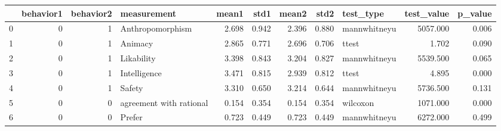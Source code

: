 \begin{tabular}{lrrlrrrrlrr}
\toprule
{} &  behavior1 &  behavior2 &              measurement &  mean1 &   std1 &  mean2 &   std2 &     test\_type &  test\_value &  p\_value \\
\midrule
0 &          0 &          1 &         Anthropomorphism &  2.698 &  0.942 &  2.396 &  0.880 &  mannwhitneyu &    5057.000 &    0.006 \\
1 &          0 &          1 &                  Animacy &  2.865 &  0.771 &  2.696 &  0.706 &         ttest &       1.702 &    0.090 \\
2 &          0 &          1 &               Likability &  3.398 &  0.843 &  3.204 &  0.827 &  mannwhitneyu &    5539.500 &    0.065 \\
3 &          0 &          1 &             Intelligence &  3.471 &  0.815 &  2.939 &  0.812 &         ttest &       4.895 &    0.000 \\
4 &          0 &          1 &                   Safety &  3.310 &  0.650 &  3.214 &  0.644 &  mannwhitneyu &    5736.500 &    0.131 \\
5 &          0 &          0 &  agreement with rational &  0.154 &  0.354 &  0.154 &  0.354 &      wilcoxon &    1071.000 &    0.000 \\
6 &          0 &          0 &                   Prefer &  0.723 &  0.449 &  0.723 &  0.449 &  mannwhitneyu &    6272.000 &    0.499 \\
\bottomrule
\end{tabular}
